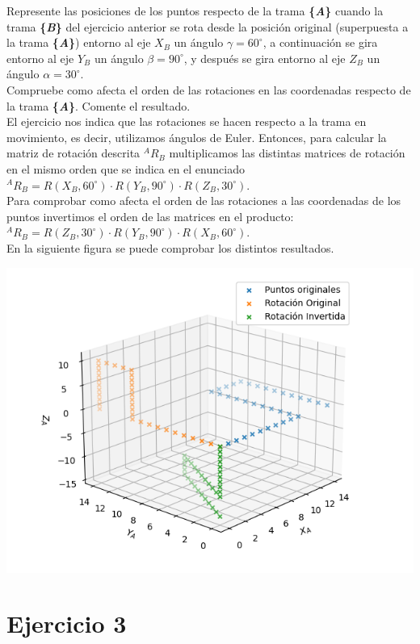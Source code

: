\documentclass[12pt,a4paper]{report}
\begin{document}
Represente las posiciones de los puntos respecto de la trama \textbf{\{\textit{A}\}} cuando la trama \textbf{\{\textit{B}\}} del ejercicio anterior se rota desde la posición original (superpuesta a la trama \textbf{\{\textit{A}\}}) entorno al eje $X_B$ un ángulo $\gamma = 60^\circ$, a continuación se gira entorno al eje $Y_B$ un ángulo $\beta = 90^\circ$, y después se gira entorno al eje $Z_B$ un ángulo $\alpha = 30^\circ$. \\
Compruebe como afecta el orden de las rotaciones en las coordenadas respecto de la trama \textbf{\{\textit{A}\}}. Comente el resultado. \\

\noindent
El ejercicio nos indica que las rotaciones se hacen respecto a la trama en movimiento, es decir, utilizamos ángulos de Euler. Entonces, para calcular la matriz de rotación descrita $^AR_B$ multiplicamos las distintas matrices de rotación en el mismo orden que se indica en el enunciado $^AR_B = R(X_B, 60^\circ) \cdot R(Y_B, 90^\circ) \cdot R(Z_B, 30^\circ)$.\\
Para comprobar como afecta el orden de las rotaciones a las coordenadas de los puntos invertimos el orden de las matrices en el producto: $^AR_B = R(Z_B, 30^\circ) \cdot R(Y_B, 90^\circ) \cdot R(X_B, 60^\circ)$.\\
En la siguiente figura se puede comprobar los distintos resultados.

\includegraphics[]{Ejercicio_2.png}

\section*{Ejercicio 3}
\end{document}
